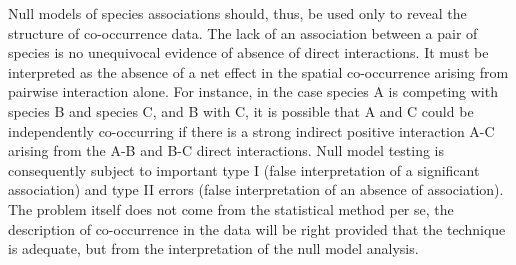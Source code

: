 Null models of species associations should, thus, be used only to reveal the
structure of co-occurrence data. The lack of an association between a pair of
species is no unequivocal evidence of absence of direct interactions. It must be interpreted as the absence of a net effect in the spatial co-occurrence arising from pairwise interaction alone. For instance, in the case species A is competing with species B and species C, and B with C, it is possible that A and C could be independently co-occurring if there is a strong indirect positive interaction A-C arising from the A-B and B-C direct interactions. Null model testing is consequently
subject to important type I (false interpretation of a significant
association) and type II errors (false interpretation of an absence of
association). The problem itself does not come from the statistical method per
se, the description of co-occurrence in the data will be right provided that
the technique is adequate, but from the interpretation of the null model
analysis.

